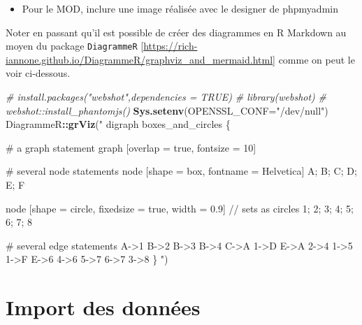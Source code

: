 \documentclass[mstat,12pt]{unswthesis}
\newenvironment{Shaded}{\begin{snugshade}}{\end{snugshade}}
\newcommand{\AttributeTok}[1]{\textcolor[rgb]{0.13,0.29,0.53}{#1}}
\newcommand{\CommentTok}[1]{\textcolor[rgb]{0.56,0.35,0.01}{\textit{#1}}}
\newcommand{\FunctionTok}[1]{\textcolor[rgb]{0.13,0.29,0.53}{\textbf{#1}}}
\newcommand{\NormalTok}[1]{#1}
\newcommand{\SpecialCharTok}[1]{\textcolor[rgb]{0.81,0.36,0.00}{\textbf{#1}}}
\newcommand{\StringTok}[1]{\textcolor[rgb]{0.31,0.60,0.02}{#1}}
\begin{document}
\begin{itemize}
\tightlist
\item
  Pour le MOD, inclure une image réalisée avec le designer de phpmyadmin
\end{itemize}

\bigskip

Noter en passant qu'il est possible de créer des diagrammes en R
Markdown au moyen du package \texttt{DiagrammeR}
{[}\url{https://rich-iannone.github.io/DiagrammeR/graphviz_and_mermaid.html}{]}
comme on peut le voir ci-dessous.

\begin{Shaded}
\begin{Highlighting}[]
\CommentTok{\# install.packages("webshot",dependencies = TRUE)}
\CommentTok{\# library(webshot)}
\CommentTok{\# webshot::install\_phantomjs()}
\FunctionTok{Sys.setenv}\NormalTok{(}\AttributeTok{OPENSSL\_CONF=}\StringTok{"/dev/null"}\NormalTok{)}
\NormalTok{DiagrammeR}\SpecialCharTok{::}\FunctionTok{grViz}\NormalTok{(}\StringTok{"}
\StringTok{digraph boxes\_and\_circles \{}

\StringTok{  \# a \textquotesingle{}graph\textquotesingle{} statement}
\StringTok{  graph [overlap = true, fontsize = 10]}

\StringTok{  \# several \textquotesingle{}node\textquotesingle{} statements}
\StringTok{  node [shape = box,}
\StringTok{        fontname = Helvetica]}
\StringTok{  A; B; C; D; E; F}

\StringTok{  node [shape = circle,}
\StringTok{        fixedsize = true,}
\StringTok{        width = 0.9] // sets as circles}
\StringTok{  1; 2; 3; 4; 5; 6; 7; 8}

\StringTok{  \# several \textquotesingle{}edge\textquotesingle{} statements}
\StringTok{  A{-}\textgreater{}1 B{-}\textgreater{}2 B{-}\textgreater{}3 B{-}\textgreater{}4 C{-}\textgreater{}A}
\StringTok{  1{-}\textgreater{}D E{-}\textgreater{}A 2{-}\textgreater{}4 1{-}\textgreater{}5 1{-}\textgreater{}F}
\StringTok{  E{-}\textgreater{}6 4{-}\textgreater{}6 5{-}\textgreater{}7 6{-}\textgreater{}7 3{-}\textgreater{}8}
\StringTok{\}}
\StringTok{"}\NormalTok{)}
\end{Highlighting}
\end{Shaded}

\section{Import des données}\label{import-des-donnuxe9es}
\end{document}
